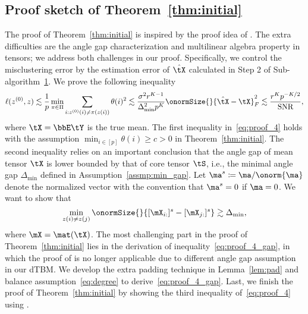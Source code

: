 \documentclass[lettersize,onecolumn,journal]{IEEEtran}
\theoremstyle{definition}
\theoremstyle{definition}
\begin{document}
\subsection{Proof sketch of Theorem~\ref{thm:initial}}
The proof of Theorem~\ref{thm:initial} is inspired by the proof idea of \citet[Lemma 1]{gao2018community}. The extra difficulties are the angle gap characterization and multilinear algebra property in tensors; we address both challenges in our proof. Specifically, we control the misclustering error by the estimation error of $\hat \tX$ calculated in Step 2 of Sub-algorithm~\hyperref[alg:main]{1}.  We prove the following inequality
\begin{equation}\label{eq:proof_4}
    \ell(z^{(0)},z) \lesssim \frac{1}{p}\min_{\pi \in \Pi} \sum_{i: z^{(0)}(i) \neq \pi(z(i))} \theta(i)^2 \lesssim \frac{\sigma^2 r^{K-1}}{ \Delta_{\min}^2 p^K} \onormSize{}{\hat \tX - \tX}_F^2 \lesssim \frac{r^K p^{-K/2}}{\text{SNR}},
\end{equation}
where $\tX = \bbE \tY$ is the true mean. The first inequality in~\eqref{eq:proof_4} holds with the assumption $\min_{i \in [p]} \theta(i) \geq c>0$ in Theorem~\ref{thm:initial}. The second inequality relies on an important conclusion that the angle gap of mean tensor $\tX$ is lower bounded by that of core tensor $\tS$, i.e., the minimal angle gap $\Delta_{\min}$ defined in Assumption~\ref{assmp:min_gap}. Let $\ma^{s} \coloneqq \ma/\onorm{\ma}$ denote the normalized vector with the convention that $\ma^s = 0$ if $\ma = 0$. We want to show that
\begin{equation}\label{eq:proof_4_gap}
\min_{z(i) \neq z(j)} \onormSize{}{[\mX_{i:}]^s - [\mX_{j:}]^s} \gtrsim \Delta_{\min},
\end{equation}
where $\mX = \mat(\tX)$. The most challenging part in the proof of Theorem~\ref{thm:initial} lies in the derivation of inequality~\eqref{eq:proof_4_gap}, in which the proof of \cite{gao2018community} is no longer applicable due to different angle gap assumption in our dTBM. We develop the extra padding technique in Lemma~\ref{lem:pad} and balance assumption~\eqref{eq:degree} to derive~\eqref{eq:proof_4_gap}. Last, we finish the proof of Theorem~\ref{thm:initial} by showing the third inequality of~\eqref{eq:proof_4} using \citet[Proposition 1]{han2020exact}. 
\end{document}

